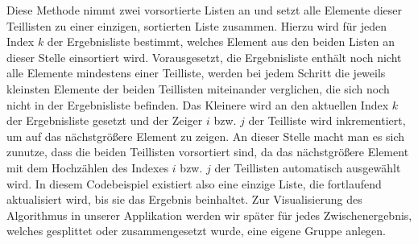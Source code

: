 Diese Methode nimmt zwei vorsortierte Listen an und setzt alle Elemente dieser Teillisten zu einer einzigen, sortierten Liste zusammen. Hierzu wird für jeden Index $k$ der Ergebnisliste bestimmt, welches Element aus den beiden Listen an dieser Stelle einsortiert wird. Vorausgesetzt, die Ergebnisliste enthält noch nicht alle Elemente mindestens einer Teilliste, werden bei jedem Schritt die jeweils kleinsten Elemente der beiden Teillisten miteinander verglichen, die sich noch nicht in der Ergebnisliste befinden. Das Kleinere wird an den aktuellen Index $k$ der Ergebnisliste gesetzt und der Zeiger $i$ bzw. $j$ der Teilliste wird inkrementiert, um auf das nächstgrößere Element zu zeigen. An dieser Stelle macht man es sich zunutze, dass die beiden Teillisten vorsortiert sind, da das nächstgrößere Element mit dem Hochzählen des Indexes $i$ bzw. $j$ der Teillisten automatisch ausgewählt wird. In diesem Codebeispiel existiert also eine einzige Liste, die fortlaufend aktualisiert wird, bis sie das Ergebnis beinhaltet. Zur Visualisierung des Algorithmus in unserer Applikation werden wir später für jedes Zwischenergebnis, welches gesplittet oder zusammengesetzt wurde, eine eigene Gruppe anlegen.
